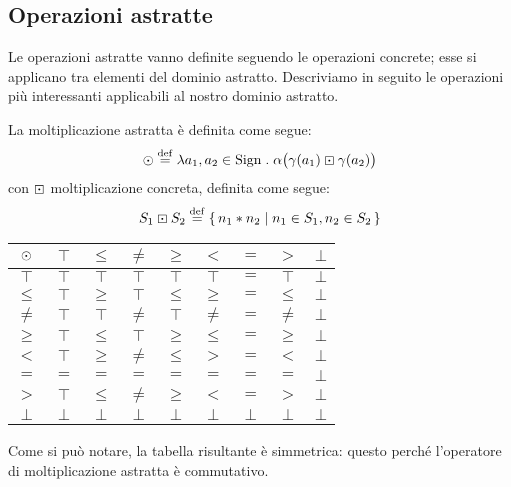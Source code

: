 \subsection{Operazioni astratte}
Le operazioni astratte vanno definite seguendo le operazioni concrete;
esse si applicano tra elementi del dominio astratto.
Descriviamo in seguito le operazioni più interessanti applicabili
al nostro dominio astratto.

\begin{definizione}
La moltiplicazione astratta è definita come segue:
\[
        \absmul \defeq \lambda a_1,a_2 \in \Sign \st \alpha\bigl(\gamma(a_1) \conmul \gamma(a_2)\bigr)
\]
con $\mathbin{\boxdot}$ moltiplicazione concreta, definita come segue:
\[
        S_1 \conmul S_2 \defeq \{\, n_1 * n_2 \mid n_1 \in S_1, n_2 \in S_2 \,\}
\]
\end{definizione}

\begin{center}
        \begin{tabular}{ c | c c c c c c c c }
                $\mathbin{\odot}$ & $\top$ & $\leq$ & $\neq$ & $\geq$ & $<$ & $=$ & $>$ & $\bot$ \\
                \hline
                $\top$ & $\top$ & $\top$ & $\top$ & $\top$ & $\top$ & $=$ & $\top$ & $\bot$  \\
                $\leq$ & $\top$ & $\geq$ & $\top$ & $\leq$ & $\geq$ & $=$ & $\leq$ & $\bot$\\
                $\neq$ & $\top$ & $\top$ & $\neq$ & $\top$ & $\neq$ & $=$ & $\neq$ & $\bot$ \\
                $\geq$ & $\top$ & $\leq$ & $\top$ & $\geq$ & $\leq$ & $=$ & $\geq$ & $\bot$ \\
                $<$ & $\top$ & $\geq$ & $\neq$ & $\leq$ & $>$ & $=$ & $<$ & $\bot$ \\
                $=$ & $=$ & $=$ & $=$ & $=$ & $=$ & $=$ & $=$ & $\bot$\\
                $>$ & $\top$ & $\leq$ & $\neq$ & $\geq$ & $<$ & $=$ & $>$ & $\bot$\\
                $\bot$ & $\bot$ & $\bot$ & $\bot$ & $\bot$ & $\bot$ & $\bot$ & $\bot$ & $\bot$ \\
        \end{tabular}
\end{center}

Come si può notare, la tabella risultante è simmetrica:
questo perché l'operatore di moltiplicazione astratta è commutativo.

